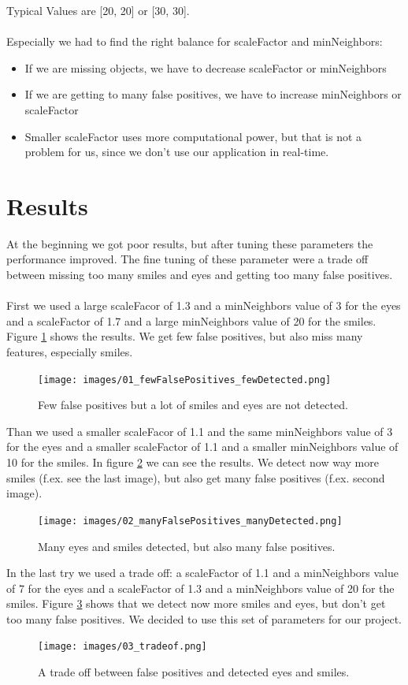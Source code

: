 \documentclass[11pt, a4paper, twocolumn]{article}
\begin{document}
Typical Values are [20, 20] or [30, 30].\\\\
Especially we had to find the right balance for scaleFactor and minNeighbors:
\begin{itemize}
    \item If we are missing objects, we have to decrease scaleFactor or minNeighbors
    \item If we are getting to many false positives, we have to increase minNeighbors or scaleFactor
    \item Smaller scaleFactor uses more computational power, but that is not a problem for us, since we don’t use our application in real-time.
\end{itemize}
%


\section*{Results}

At the beginning we got poor results, but after tuning these parameters the performance improved. The fine tuning of these parameter were a trade off between missing too many smiles and eyes and getting too many false positives. \\\\
%
First we used a large scaleFacor of 1.3 and a minNeighbors value of 3 for the eyes and a scaleFactor of 1.7 and a large minNeighbors value of 20 for the smiles. Figure \ref{fig:01_fewFalsePositives} shows the results. We get few false positives, but also miss many features, especially smiles.
%
\begin{figure}[H]
 \texttt{[image: images/01\_fewFalsePositives\_fewDetected.png]}
 \centering
 \setlength{\abovecaptionskip}{1pt}
 \caption{Few false positives but a lot of smiles and eyes are not detected.}
 \label{fig:01_fewFalsePositives}
\end{figure}
%
Than we used a smaller scaleFacor of 1.1 and the same minNeighbors value of 3 for the eyes and a smaller scaleFactor of 1.1 and a smaller minNeighbors value of 10 for the smiles. In figure \ref{fig:01_manyFalsePositives} we can see the results. We detect now way more smiles (f.ex. see the last image), but also get many false positives (f.ex. second image).
\begin{figure}[H]
 \texttt{[image: images/02\_manyFalsePositives\_manyDetected.png]}
 \centering
 \setlength{\abovecaptionskip}{1pt}
 \caption{Many eyes and smiles detected, but also many false positives.}
 \label{fig:01_manyFalsePositives}
\end{figure}
%
In the last try we used a trade off: a scaleFactor of 1.1 and a minNeighbors value of 7 for the eyes and a scaleFactor of 1.3 and a minNeighbors value of 20 for the smiles. Figure \ref{fig:03_tradeof} shows that we detect now more smiles and eyes, but don't get too many false positives. We decided to use this set of parameters for our project.
\begin{figure}[H]
 \texttt{[image: images/03\_tradeof.png]}
 \centering
 \setlength{\abovecaptionskip}{1pt}
 \caption{A trade off between false positives and detected eyes and smiles.}
 \label{fig:03_tradeof}
\end{figure}
\end{document}
